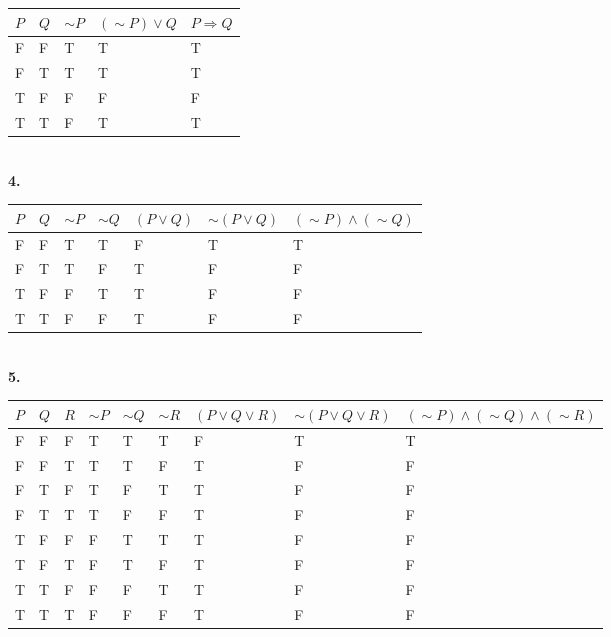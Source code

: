 \documentclass[12pt]{article}
\begin{document}
\begin{table}[!h]
\centering
\begin{tabular}{|l|l|l|l|l|}
\hline
\rowcolor[HTML]{EFEFEF} 
$P$ & $Q$ & $\sim P$ & $(\sim P) \lor Q$ & $P \Rightarrow Q$ \\ \hline
F   & F   & T        & T                 & T                 \\ \hline
F   & T   & T        & T                 & T                 \\ \hline
T   & F   & F        & F                 & F                 \\ \hline
T   & T   & F        & T                 & T                 \\ \hline
\end{tabular}
\end{table}\\
\textbf{4.}
\begin{table}[!h]
\centering
\begin{tabular}{|l|l|l|l|l|l|l|}
\hline
\rowcolor[HTML]{EFEFEF} 
$P$ & $Q$ & $\sim P$ & $\sim Q$ & $(P \lor Q)$ & $\sim (P \lor Q)$ & $(\sim P) \land (\sim Q)$ \\ \hline
F   & F   & T        & T        & F            & T                 & T                         \\ \hline
F   & T   & T        & F        & T            & F                 & F                         \\ \hline
T   & F   & F        & T        & T            & F                 & F                         \\ \hline
T   & T   & F        & F        & T            & F                 & F                         \\ \hline
\end{tabular}
\end{table}\\
\textbf{5.}
\begin{table}[!h]
\centering
\begin{tabular}{|l|l|l|l|l|l|l|l|l|}
\hline
\rowcolor[HTML]{EFEFEF} 
$P$ & $Q$ & $R$ & $\sim P$ & $\sim Q$ & $\sim R$ & $(P \lor Q \lor R)$ & $\sim (P \lor Q \lor R)$ & $(\sim P) \land (\sim Q) \land (\sim R)$ \\ \hline
F & F & F & T & T & T & F & T & T \\ \hline
F & F & T & T & T & F & T & F & F \\ \hline
F & T & F & T & F & T & T & F & F \\ \hline
F & T & T & T & F & F & T & F & F \\ \hline
T & F & F & F & T & T & T & F & F \\ \hline
T & F & T & F & T & F & T & F & F \\ \hline
T & T & F & F & F & T & T & F & F \\ \hline
T & T & T & F & F & F & T & F & F \\ \hline
\end{tabular}
\end{table}\\
\end{document}
